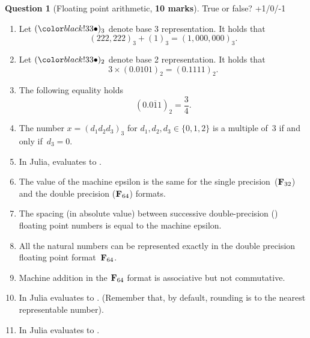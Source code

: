 \documentclass[11pt]{article}
\theoremstyle{definition}
\newtheorem{question}{Question}
\theoremstyle{remark}
\theoremstyle{plain}%
\begin{document}
\newpage
\begin{question}
    [Floating point arithmetic, \textbf{10 marks}]
    True or false? +1/0/-1
    \begin{enumerate}
        \item
            Let $(\placeholder)_3$ denote base 3 representation.
            It holds that
            \[
                (222,222)_3 + (1)_3 = (1,000,000)_3.
            \]

        \item
            Let $(\placeholder)_2$ denote base 2 representation.
            It holds that
            \[
                3 \times (0.0101)_2 = (0.1111)_2.
            \]

        \item
            The following equality holds
            \[
                (0.\overline{011})_2 = \frac{3}{4}.
            \]

        \item
            The number $x = (d_1 d_2 d_3)_3$ for $d_1, d_2, d_3 \in \{0, 1, 2\}$ is a multiple of~$3$ if and only if~$d_3 = 0$.

        \item
            In Julia,  evaluates to .

        \item
            The value of the machine epsilon is the same for the single precision~($\mathbf F_{32}$) and the double precision ($\mathbf F_{64}$) formats.

        \item
            The spacing (in absolute value) between successive double-precision () floating point numbers is equal to the machine epsilon.

        \item
            All the natural numbers can be represented exactly in the double precision floating point format~$\mathbf F_{64}$.

        \item
            Machine addition in the $\mathbf F_{64}$ format is associative but not commutative.

        \item
             In Julia  evaluates to .
             (Remember that, by default, rounding is to the nearest representable number).

        \item
             In Julia  evaluates to .


\end{enumerate}
\end{question}
\end{document}
